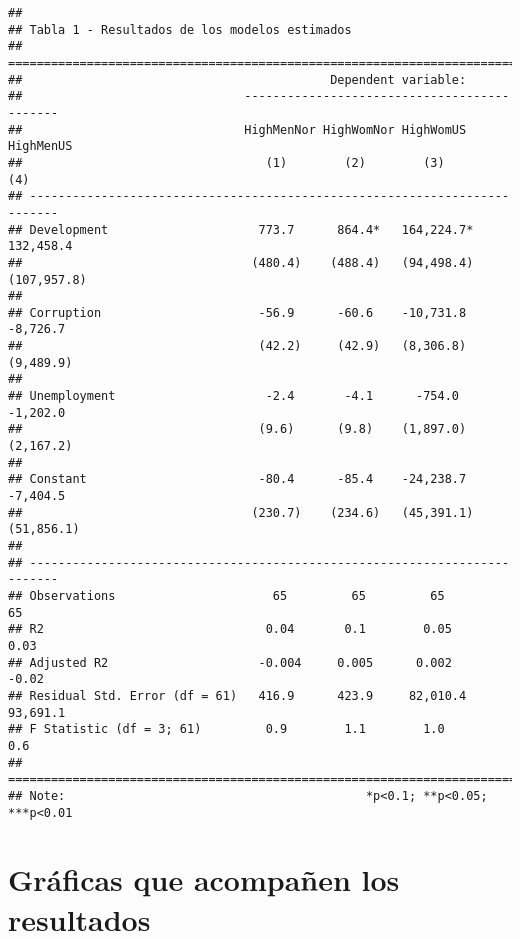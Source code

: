 \documentclass[
]{article}
\begin{document}
\begin{verbatim}
## 
## Tabla 1 - Resultados de los modelos estimados
## ==========================================================================
##                                           Dependent variable:             
##                               --------------------------------------------
##                               HighMenNor HighWomNor HighWomUS   HighMenUS 
##                                  (1)        (2)        (3)         (4)    
## --------------------------------------------------------------------------
## Development                     773.7      864.4*   164,224.7*  132,458.4 
##                                (480.4)    (488.4)   (94,498.4) (107,957.8)
##                                                                           
## Corruption                      -56.9      -60.6    -10,731.8   -8,726.7  
##                                 (42.2)     (42.9)   (8,306.8)   (9,489.9) 
##                                                                           
## Unemployment                     -2.4       -4.1      -754.0    -1,202.0  
##                                 (9.6)      (9.8)    (1,897.0)   (2,167.2) 
##                                                                           
## Constant                        -80.4      -85.4    -24,238.7   -7,404.5  
##                                (230.7)    (234.6)   (45,391.1) (51,856.1) 
##                                                                           
## --------------------------------------------------------------------------
## Observations                      65         65         65         65     
## R2                               0.04       0.1        0.05       0.03    
## Adjusted R2                     -0.004     0.005      0.002       -0.02   
## Residual Std. Error (df = 61)   416.9      423.9     82,010.4   93,691.1  
## F Statistic (df = 3; 61)         0.9        1.1        1.0         0.6    
## ==========================================================================
## Note:                                          *p<0.1; **p<0.05; ***p<0.01
\end{verbatim}

\hypertarget{gruxe1ficas-que-acompauxf1en-los-resultados}{%
\section{Gráficas que acompañen los
resultados}\label{gruxe1ficas-que-acompauxf1en-los-resultados}}
\end{document}
